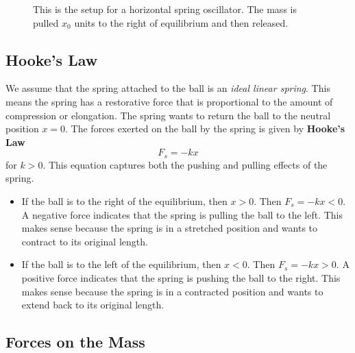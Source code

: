\documentclass[11pt,letterpaper]{article}
\begin{document}
\begin{figure}[H]

\caption{
This is the setup for a horizontal spring oscillator.
The mass is pulled $x_0$ units to the right of equilibrium and then released.
}
\end{figure}

\subsection{Hooke's Law}
We assume that the spring attached to the ball is an \textit{ideal linear spring}. This means the spring has a restorative force that is proportional to the amount of compression or elongation. The spring wants to return the ball to the neutral position $x=0$. The forces exerted on the ball by the spring is given by \textbf{Hooke's Law}
$$F_s=-kx$$ for $k>0$. This equation captures both the pushing and pulling effects of the spring.
\begin{itemize}
    \item If the ball is to the right of the equilibrium, then $x>0$. Then $F_s=-kx <0$. A negative force indicates that the spring is pulling the ball to the left. This makes sense because the spring is in a stretched position and wants to contract to its original length.
    
    \item If the ball is to the left of the equilibrium, then $x<0$. Then $F_s=-kx >0$. A positive force indicates that the spring is pushing the ball to the right. This makes sense because the spring is in a contracted position and wants to extend back to its original length.
\end{itemize}


\subsection{Forces on the Mass}
\end{document}

